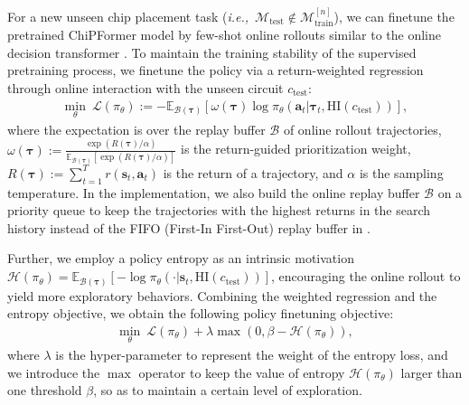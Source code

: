 \documentclass{article}
\newcommand{\ie}{\textit{i.e.,}~}
\newcommand{\bs}{\bm{s}}
\newcommand{\ba}{\bm{a}}
\newcommand{\bc}{{c}}
\newcommand{\btau}{\bm{\tau}}
\theoremstyle{plain}
\theoremstyle{definition}
\theoremstyle{remark}
\begin{document}
For a new unseen chip placement task (\ie $\mathcal{M}_{\text{test}}\notin \mathcal{M}_{\text{train}}^{[n]}$), we can finetune the pretrained ChiPFormer model by few-shot online rollouts similar to the online decision transformer \cite{zheng2022online}. To maintain the training stability of the supervised pretraining process, we finetune the policy via a return-weighted regression through online interaction with the unseen {circuit $c_{\text{test}}$}: 
\begin{align}
\min_{\theta} \ \mathcal{L}(\pi_\theta) := -  \mathbb{E}_{\mathcal{B}(\btau)} \left[ \omega(\btau) \log \pi_\theta(\ba_t|\btau_{t}, \text{HI}(\bc_{\text{test}}))\right], \nonumber 
\end{align}
where the expectation is over the replay buffer $\mathcal{B}$ of online rollout trajectories, $\omega(\btau):= \frac{\exp(R(\btau)/\alpha)}{\mathbb{E}_{\mathcal{B}(\btau)}\left[\exp(R(\btau)/\alpha)\right]}$ is the return-guided prioritization weight, $R(\btau) := \sum_{t=1}^{T}r(\bs_t,\ba_t)$ is the return of a trajectory, and $\alpha$ is the sampling temperature. 
In the implementation, we also build the online replay buffer $\mathcal{B}$ on a priority queue to keep the trajectories with the highest returns in the search history instead of the FIFO (First-In First-Out) replay buffer in \citet{zheng2022online}. 


Further, we employ a policy entropy as an intrinsic motivation $\mathcal{H}(\pi_\theta) = \mathbb{E}_{\mathcal{B}(\btau)} \left[ - \log \pi_\theta(\cdot|\bs_t, \text{HI}(\bc_{\text{test}}))  \right]$,  encouraging the online rollout to yield more exploratory behaviors. Combining the weighted regression and the entropy objective, we obtain the following  policy finetuning objective:
\begin{align}
\min_{\theta} \ \mathcal{L}(\pi_\theta)  + \lambda \max(0, \beta - \mathcal{H}(\pi_\theta)), \label{eq:finetuning}
\end{align}
where $\lambda$ is the hyper-parameter to represent the weight of the entropy loss, and we introduce the $\max$ operator to keep the value of entropy $\mathcal{H}(\pi_\theta)$ larger than one threshold $\beta$, so as to maintain a certain level of exploration. 
\end{document}
